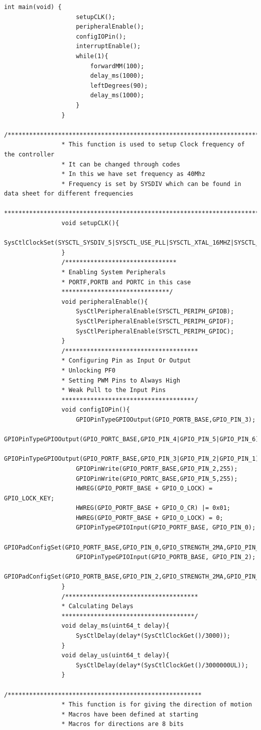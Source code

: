 \documentclass[a4paper,10pt,oneside]{article}
\begin{document}
\begin{lstlisting}[style=CStyle]
				int main(void) {
					setupCLK();
					peripheralEnable();
					configIOPin();
					interruptEnable();
					while(1){
						forwardMM(100);
						delay_ms(1000);
						leftDegrees(90);
						delay_ms(1000);
					}
				}
				/***************************************************************************************
				* This function is used to setup Clock frequency of the controller
				* It can be changed through codes
				* In this we have set frequency as 40Mhz
				* Frequency is set by SYSDIV which can be found in data sheet for different frequencies
				***************************************************************************************/
				void setupCLK(){
					SysCtlClockSet(SYSCTL_SYSDIV_5|SYSCTL_USE_PLL|SYSCTL_XTAL_16MHZ|SYSCTL_OSC_MAIN);
				}
				/*******************************
				* Enabling System Peripherals
				* PORTF,PORTB and PORTC in this case
				******************************/
				void peripheralEnable(){
					SysCtlPeripheralEnable(SYSCTL_PERIPH_GPIOB);
					SysCtlPeripheralEnable(SYSCTL_PERIPH_GPIOF);
					SysCtlPeripheralEnable(SYSCTL_PERIPH_GPIOC);
				}
				/*************************************
				* Configuring Pin as Input Or Output
				* Unlocking PF0
				* Setting PWM Pins to Always High
				* Weak Pull to the Input Pins
				*************************************/
				void configIOPin(){
					GPIOPinTypeGPIOOutput(GPIO_PORTB_BASE,GPIO_PIN_3);
					GPIOPinTypeGPIOOutput(GPIO_PORTC_BASE,GPIO_PIN_4|GPIO_PIN_5|GPIO_PIN_6);
					GPIOPinTypeGPIOOutput(GPIO_PORTF_BASE,GPIO_PIN_3|GPIO_PIN_2|GPIO_PIN_1);
					GPIOPinWrite(GPIO_PORTF_BASE,GPIO_PIN_2,255);
					GPIOPinWrite(GPIO_PORTC_BASE,GPIO_PIN_5,255);
					HWREG(GPIO_PORTF_BASE + GPIO_O_LOCK) = GPIO_LOCK_KEY;
					HWREG(GPIO_PORTF_BASE + GPIO_O_CR) |= 0x01;
					HWREG(GPIO_PORTF_BASE + GPIO_O_LOCK) = 0;
					GPIOPinTypeGPIOInput(GPIO_PORTF_BASE, GPIO_PIN_0);
					GPIOPadConfigSet(GPIO_PORTF_BASE,GPIO_PIN_0,GPIO_STRENGTH_2MA,GPIO_PIN_TYPE_STD_WPU);
					GPIOPinTypeGPIOInput(GPIO_PORTB_BASE, GPIO_PIN_2);
					GPIOPadConfigSet(GPIO_PORTB_BASE,GPIO_PIN_2,GPIO_STRENGTH_2MA,GPIO_PIN_TYPE_STD_WPU);
				}
				/*************************************
				* Calculating Delays
				*************************************/
				void delay_ms(uint64_t delay){
					SysCtlDelay(delay*(SysCtlClockGet()/3000));
				}
				void delay_us(uint64_t delay){
					SysCtlDelay(delay*(SysCtlClockGet()/3000000UL));
				}
				/******************************************************
				* This function is for giving the direction of motion
				* Macros have been defined at starting
				* Macros for directions are 8 bits

\end{lstlisting}
\end{document}
